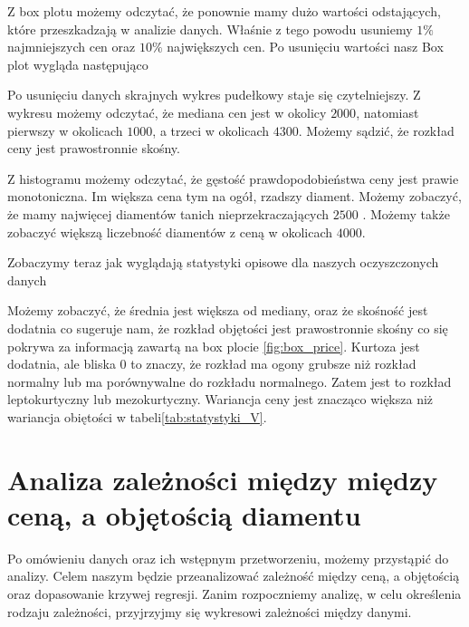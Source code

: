 \documentclass[12pt]{article}
\theoremstyle{exer}
\begin{document}
	Z box plotu możemy odczytać, że ponownie mamy dużo wartości odstających, które przeszkadzają w analizie danych. Właśnie z tego powodu usuniemy $ 1 \% $ najmniejszych cen oraz  $ 10\%$ największych cen.
	Po usunięciu wartości nasz Box plot wygląda następująco

	Po usunięciu danych skrajnych wykres pudełkowy staje się czytelniejszy. Z wykresu możemy odczytać, że mediana cen jest w okolicy $2000$, natomiast pierwszy w okolicach $1000$, a trzeci w okolicach $4300$. Możemy sądzić, że rozkład ceny jest prawostronnie skośny.
	

 Z histogramu możemy odczytać, że gęstość prawdopodobieństwa ceny jest prawie monotoniczna. Im większa cena tym na ogół, rzadszy diament. Możemy zobaczyć, że mamy najwięcej diamentów tanich nieprzekraczających $2500$ . Możemy także zobaczyć większą liczebność diamentów z ceną w okolicach $4000$. 
 
		Zobaczymy teraz jak wyglądają statystyki opisowe dla naszych oczyszczonych danych
	
	\begin{table}[H]
		\caption{Podstawowe statystyki opisowe dla objętości.}
		\label{tab:statystyki_price}
	\end{table}
	Możemy zobaczyć, że średnia jest większa od mediany, oraz że skośność jest dodatnia co sugeruje nam, że rozkład objętości jest prawostronnie skośny co się pokrywa za informacją zawartą na box plocie \ref{fig:box_price}. Kurtoza jest dodatnia, ale bliska $0$ to znaczy, że rozkład ma ogony grubsze niż rozkład normalny lub ma porównywalne do rozkładu normalnego. Zatem jest to rozkład leptokurtyczny lub mezokurtyczny. Wariancja ceny jest znacząco większa niż wariancja obiętości w tabeli\ref{tab:statystyki_V}.  
	
	\section{Analiza zależności między między ceną, a objętością diamentu}
	Po omówieniu danych oraz ich wstępnym przetworzeniu, możemy przystąpić do analizy. Celem naszym będzie przeanalizować zależność między ceną, a objętością oraz dopasowanie krzywej regresji. Zanim rozpoczniemy analizę, w celu określenia rodzaju zależności, przyjrzyjmy się wykresowi zależności między danymi. %
\end{document}
